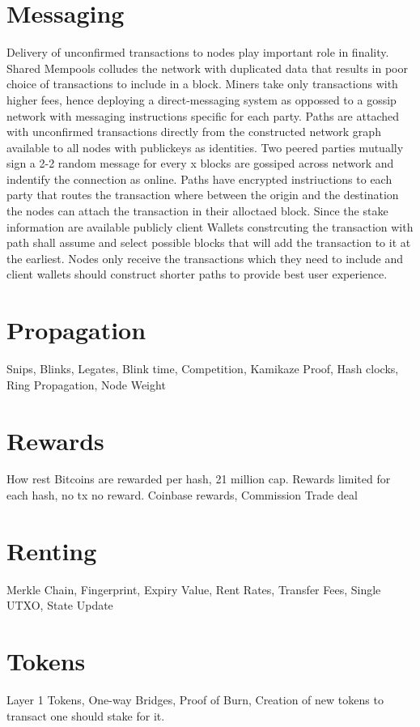 \documentclass[a4paper,10pt]{article}
\begin{document}
\section{Messaging}
Delivery of unconfirmed transactions to nodes play important role in finality. Shared Mempools colludes the network with duplicated data that results in poor choice of transactions to include in a block. Miners take only transactions with higher fees, hence deploying a direct-messaging system as oppossed to a gossip network with messaging instructions specific for each party. Paths are attached with unconfirmed transactions directly from the constructed network graph available to all nodes with publickeys as identities. Two peered parties mutually sign a 2-2 random message for every x blocks are gossiped across network and indentify the connection as online. Paths have encrypted instriuctions to each party that routes the transaction where between the origin and the destination the nodes can attach the transaction in their alloctaed block. Since the stake information are available publicly client Wallets constrcuting the transaction with path shall assume and select possible blocks that will add the transaction to it at the earliest. Nodes only receive the transactions which they need to include and client wallets should construct shorter paths to provide best user experience.

\section{Propagation}
Snips, Blinks, Legates, Blink time, Competition, Kamikaze Proof, Hash clocks, Ring Propagation, Node Weight

\section{Rewards}
How rest Bitcoins are rewarded per hash, 21 million cap. Rewards limited for each hash, no tx no reward. Coinbase rewards, Commission Trade deal

\section{Renting}
Merkle Chain, Fingerprint, Expiry Value, Rent Rates, Transfer Fees, Single UTXO, State Update

\section{Tokens}
Layer 1 Tokens, One-way Bridges, Proof of Burn, Creation of new tokens to transact one should stake for it.
\end{document}
